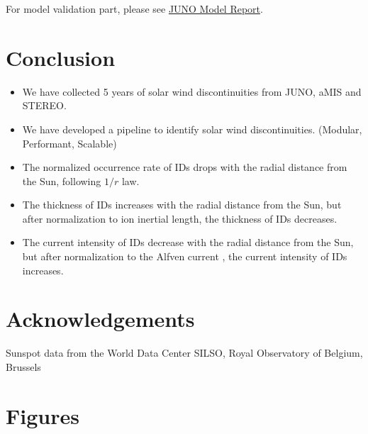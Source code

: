\documentclass[
]{agujournal2019}
\providecommand{\tightlist}{%
  \setlength{\itemsep}{0pt}\setlength{\parskip}{0pt}}\usepackage{longtable,booktabs,array}
\begin{document}
For model validation part, please see \href{notebooks/20_model.ipynb}{JUNO Model Report}.

\section{Conclusion}\label{conclusion}

\begin{itemize}
\tightlist
\item
  We have collected 5 years of solar wind discontinuities from JUNO, aMIS and STEREO.
\item
  We have developed a pipeline to identify solar wind discontinuities. (Modular, Performant, Scalable)
\item
  The normalized occurrence rate of IDs drops with the radial distance from the Sun, following \(1/r\) law.
\item
  The thickness of IDs increases with the radial distance from the Sun, but after normalization to ion inertial length, the thickness of IDs decreases.
\item
  The current intensity of IDs decrease with the radial distance from the Sun, but after normalization to the Alfven current , the current intensity of IDs increases.
\end{itemize}

\section{Acknowledgements}\label{acknowledgements}

Sunspot data from the World Data Center SILSO, Royal Observatory of Belgium, Brussels

\section{Figures}\label{figures}
\end{document}
